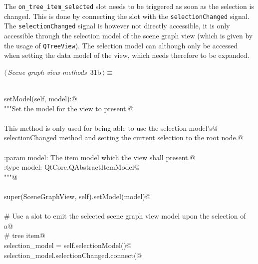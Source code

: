 \documentclass[
    a4paper,      %
    10pt,         %
    openright,    %
    notitlepage,  %
    parskip=half, %
]{scrreprt}       %
\theoremstyle{definition}                    %
\begin{document}
The \verb+on_tree_item_selected+ slot needs to be triggered as soon as the
selection is changed. This is done by connecting the slot with the
\verb+selectionChanged+ signal. The \verb+selectionChanged+ signal is however
not directly accessible, it is only accessible through the selection model of
the scene graph view (which is given by the usage of \verb+QTreeView+). The
selection model can although only be accessed when setting the data model of the
view, which needs therefore to be expanded.

\begin{flushleft} \small
\begin{minipage}{\linewidth}\label{scrap35}\raggedright\small
{} $\langle\,${\itshape Scene graph view methods}\nobreak\ {\footnotesize {31b}}$\,\rangle\equiv$
\vspace{-1exm}
\begin{list}{}{} \item
\mbox{}\lstinline@@\\
\mbox{}\lstinline@def setModel(self, model):@\\
\mbox{}\lstinline@    """Set the model for the view to present.@\\
\mbox{}\lstinline@@\\
\mbox{}\lstinline@    This method is only used for being able to use the selection model's@\\
\mbox{}\lstinline@    selectionChanged method and setting the current selection to the root node.@\\
\mbox{}\lstinline@@\\
\mbox{}\lstinline@    :param model: The item model which the view shall present.@\\
\mbox{}\lstinline@    :type  model: QtCore.QAbstractItemModel@\\
\mbox{}\lstinline@    """@\\
\mbox{}\lstinline@@\\
\mbox{}\lstinline@    super(SceneGraphView, self).setModel(model)@\\
\mbox{}\lstinline@@\\
\mbox{}\lstinline@    # Use a slot to emit the selected scene graph view model upon the selection of a@\\
\mbox{}\lstinline@    # tree item@\\
\mbox{}\lstinline@    selection_model = self.selectionModel()@\\
\mbox{}\lstinline@    selection_model.selectionChanged.connect(@\\

\end{list}
\end{minipage}
\end{flushleft}
\end{document}
